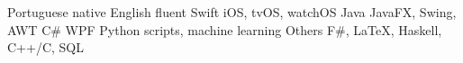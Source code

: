 \begin{cvskills}
  \cvskill
    {Portuguese}
    {native}
  \cvskill
    {English}
    {fluent}
  \cvskill
    {Swift}
    {iOS, tvOS, watchOS}
  \cvskill
    {Java}
    {JavaFX, Swing, AWT}
  \cvskill
    {C\#}
    {WPF}
  \cvskill
    {Python}
    {scripts, machine learning}
  \cvskill
    {Others}
    {F\#, \LaTeX, Haskell, C++/C, SQL}
\end{cvskills}
